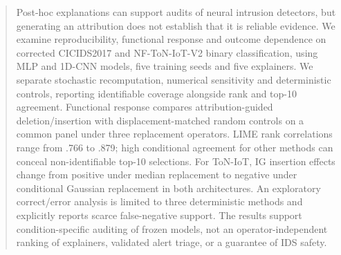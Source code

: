 \begin{abstract}
Post-hoc explanations can support audits of neural intrusion detectors, but
generating an attribution does not establish that it is reliable evidence.
We examine reproducibility, functional response and outcome dependence on
corrected CICIDS2017 and NF-ToN-IoT-V2 binary classification, using MLP and
1D-CNN models, five training seeds and five explainers. We separate stochastic
recomputation, numerical sensitivity and deterministic controls, reporting
identifiable coverage alongside rank and top-10 agreement. Functional response
compares attribution-guided deletion/insertion with displacement-matched random
controls on a common panel under three replacement operators. LIME rank
correlations range from .766 to .879; high conditional agreement for other
methods can conceal non-identifiable top-10 selections. For ToN-IoT, IG insertion
effects change from positive under median replacement to negative under
conditional Gaussian replacement in both architectures. An exploratory
correct/error analysis is limited to three deterministic methods and
explicitly reports scarce false-negative support. The results support
condition-specific auditing of frozen models, not an operator-independent
ranking of explainers, validated alert triage, or a guarantee of IDS safety.
\end{abstract}
